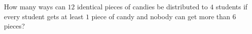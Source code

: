 How many ways can $12$ identical pieces of candies be distributed to $4$ students if every student gets at least $1$ piece of candy and nobody can get more than 6 pieces?
